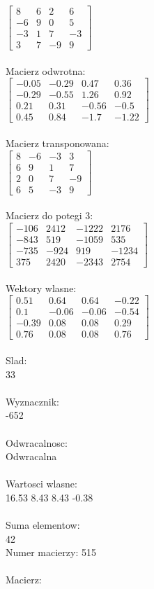 \documentclass[a4paper,12pt]{article}
\begin{document}
$\begin{bmatrix} 8&6&2&6\\-6&9&0&5\\-3&1&7&-3\\3&7&-9&9 \end{bmatrix}$
\\
\\
Macierz odwrotna:\\

$\begin{bmatrix} -0.05&-0.29&0.47&0.36\\-0.29&-0.55&1.26&0.92\\0.21&0.31&-0.56&-0.5\\0.45&0.84&-1.7&-1.22 \end{bmatrix}$
\\
\\
Macierz transponowana:\\

$\begin{bmatrix} 8&-6&-3&3\\6&9&1&7\\2&0&7&-9\\6&5&-3&9 \end{bmatrix}$
\\
\\
Macierz do potegi 3:\\

$\begin{bmatrix} -106&2412&-1222&2176\\-843&519&-1059&535\\-735&-924&919&-1234\\375&2420&-2343&2754 \end{bmatrix}$
\\
\\
Wektory wlasne:\\

$\begin{bmatrix} 0.51&0.64&0.64&-0.22\\0.1&-0.06&-0.06&-0.54\\-0.39&0.08&0.08&0.29\\0.76&0.08&0.08&0.76 \end{bmatrix}$
\\
\\
Slad:\\
33
\\
\\
Wyznacznik:\\
-652
\\
\\
Odwracalnosc:\\
Odwracalna
\\
\\
Wartosci wlasne:\\
16.53 8.43 8.43 -0.38
\\
\\
Suma elementow:\\
42
\\
\newpage
Numer macierzy:
515
\\
\\
Macierz:\\
\end{document}
